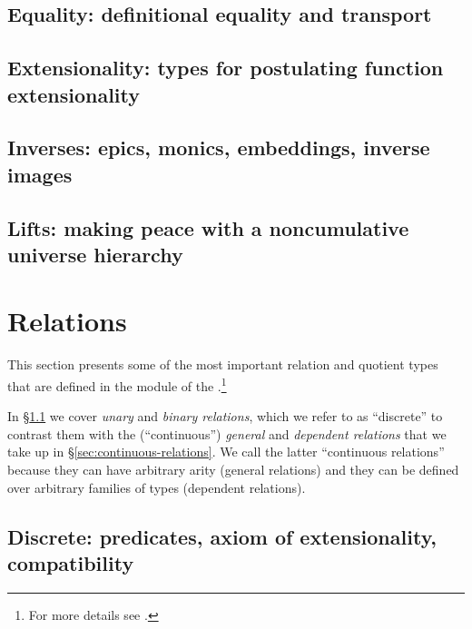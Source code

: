 \documentclass[a4paper,UKenglish,cleveref,autoref,thm-restate]{../lipics-v2021-wjd}
\begin{document}
\subsection{Equality: definitional equality and transport}\label{equality}\firstsentence{\ualibEquality}{\urlEquality}

\subsection{Extensionality: types for postulating function extensionality}\label{function-extensionality}\firstsentence{\ualibExtensionality}{\urlExtensionality}

\subsection{Inverses: epics, monics, embeddings, inverse images}\label{sec:inverse-image-invers}\firstsentence{\ualibInverses}{\urlInverses}

\subsection{Lifts: making peace with a noncumulative universe hierarchy}\label{sec:lifts-altern-univ}\firstsentence{\ualibLifts}{\urlLifts}


\section{Relations}\label{sec:relat-quot-types}
This section presents some of the most important relation and quotient types that are defined in the \ualibRelations module of the \agdaualib.\footnote{For more details see \urlRelations.}

In \S\ref{sec:discrete-relations} we cover \emph{unary} and \emph{binary relations}, which we refer to as ``discrete'' to contrast them with the (``continuous'') \emph{general} and \emph{dependent relations} that we take up in \S\ref{sec:continuous-relations}. We call the latter ``continuous relations'' because they can have arbitrary arity (general relations) and they can be defined over arbitrary families of types (dependent relations).

\subsection{Discrete: predicates, axiom of extensionality, compatibility}\label{sec:discrete-relations}\firstsentence{\ualibDiscrete}{\urlDiscrete}

\end{document}
